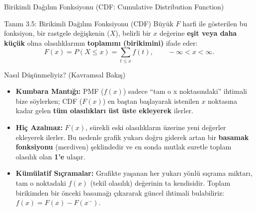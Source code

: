 \documentclass[light]{lutbeamer}
\begin{document}
\begin{frame}{Birikimli Dağılım Fonksiyonu (CDF: Cumulative Distribution Function)}
    \small
    \begin{block}{Tanım 3.5: Birikimli Dağılım Fonksiyonu (CDF)}
        Büyük $F$ harfi ile gösterilen bu fonksiyon, bir rastgele değişkenin ($X$), belirli bir $x$ değerine \textbf{eşit veya daha küçük} olma olasılıklarının \textbf{toplamını (birikimini)} ifade eder:
        \[
        F(x) = P(X \le x) = \sum_{t \le x} f(t), \qquad -\infty < x < \infty.
        \]
    \end{block}

    \begin{exampleblock}{Nasıl Düşünmeliyiz? (Kavramsal Bakış)}
        \begin{itemize}
            \item \textbf{Kumbara Mantığı:} PMF ($f(x)$) sadece ``tam o x noktasındaki'' ihtimali bize söylerken; CDF ($F(x)$) en baştan başlayarak istenilen $x$ noktasına kadar gelen \textbf{tüm olasılıkları üst üste ekleyerek} ilerler.
            \item \textbf{Hiç Azalmaz:} $F(x)$, sürekli eski olasılıkların üzerine yeni değerler ekleyerek ilerler. Bu nedenle grafik yukarı doğru giderek artan bir \textbf{basamak fonksiyonu} (merdiven) şeklindedir ve en sonda mutlak suretle toplam olasılık olan \textbf{1'e} ulaşır.
            \item \textbf{Kümülatif Sıçramalar:} Grafikte yaşanan her yukarı yönlü  sıçrama miktarı, tam o noktadaki $f(x)$ (tekil olasılık) değerinin ta kendisidir. Toplam birikimden bir önceki basamağı çıkararak güncel ihtimali bulabiliriz: $f(x) = F(x) - F(x^{-})$.
        \end{itemize}
    \end{exampleblock}
\end{frame}
\end{document}
